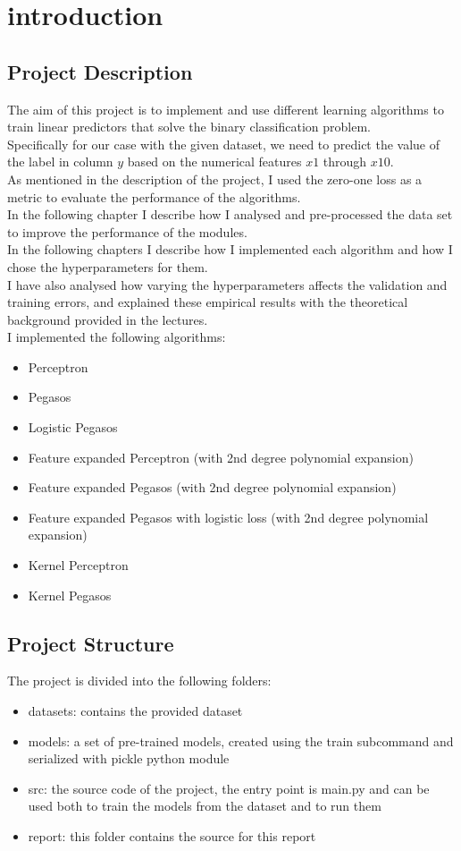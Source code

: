 \newpage
\section{introduction}
\subsection{Project Description}
The aim of this project is to implement and use different learning algorithms to train linear predictors that solve the binary classification problem.\\
Specifically for our case with the given dataset, we need to predict the value of the label in column $y$ based on the numerical features $x1$ through $x10$.\\
As mentioned in the description of the project, I used the zero-one loss as a metric to evaluate the performance of the algorithms.\\
In the following chapter I describe how I analysed and pre-processed the data set to improve the performance of the modules.\\
In the following chapters I describe how I implemented each algorithm and how I chose the hyperparameters for them.\\
I have also analysed how varying the hyperparameters affects the validation and training errors, and explained these empirical results with the theoretical background provided in the lectures.\\

I implemented the following algorithms:
\begin{itemize}
\item Perceptron
\item Pegasos
\item Logistic Pegasos
\item Feature expanded Perceptron (with 2nd degree polynomial expansion)
\item Feature expanded Pegasos (with 2nd degree polynomial expansion)
\item Feature expanded Pegasos with logistic loss (with 2nd degree polynomial expansion)
\item Kernel Perceptron
\item Kernel Pegasos
\end{itemize}

\subsection{Project Structure}
The project is divided into the following folders:
\begin{itemize}
\item datasets: contains the provided dataset
\item models: a set of pre-trained models, created using the train subcommand and serialized with pickle python module
\item src: the source code of the project, the entry point is main.py and can be used both to train the models from the dataset and to run them
\item report: this folder contains the source for this report
\end{itemize}


